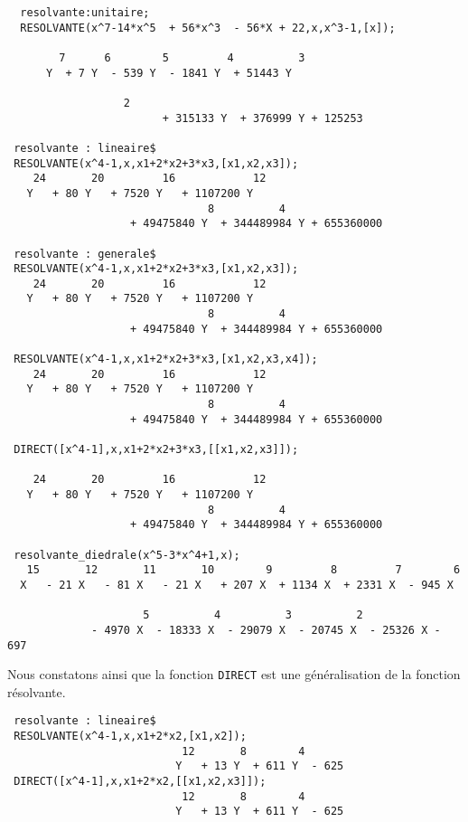 \begin{verbatim}
  resolvante:unitaire;
  RESOLVANTE(x^7-14*x^5  + 56*x^3  - 56*X + 22,x,x^3-1,[x]);

        7      6        5         4          3   
      Y  + 7 Y  - 539 Y  - 1841 Y  + 51443 Y  

				  2
                        + 315133 Y  + 376999 Y + 125253  

 resolvante : lineaire$
 RESOLVANTE(x^4-1,x,x1+2*x2+3*x3,[x1,x2,x3]);
    24       20         16            12       
   Y   + 80 Y   + 7520 Y   + 1107200 Y   
                               8	      4
                   + 49475840 Y  + 344489984 Y + 655360000
                                                      
 resolvante : generale$
 RESOLVANTE(x^4-1,x,x1+2*x2+3*x3,[x1,x2,x3]);
    24       20         16            12       
   Y   + 80 Y   + 7520 Y   + 1107200 Y   
                               8	      4
                   + 49475840 Y  + 344489984 Y + 655360000

 RESOLVANTE(x^4-1,x,x1+2*x2+3*x3,[x1,x2,x3,x4]);
    24       20         16            12       
   Y   + 80 Y   + 7520 Y   + 1107200 Y   
                               8	      4
                   + 49475840 Y  + 344489984 Y + 655360000

 DIRECT([x^4-1],x,x1+2*x2+3*x3,[[x1,x2,x3]]);

    24       20         16            12       
   Y   + 80 Y   + 7520 Y   + 1107200 Y   
                               8	      4
                   + 49475840 Y  + 344489984 Y + 655360000

 resolvante_diedrale(x^5-3*x^4+1,x);
   15       12       11       10        9         8         7        6
  X   - 21 X   - 81 X   - 21 X   + 207 X  + 1134 X  + 2331 X  - 945 X

                     5          4          3          2
             - 4970 X  - 18333 X  - 29079 X  - 20745 X  - 25326 X - 697
\end{verbatim}
\normalsize
Nous constatons ainsi que la fonction {\tt DIRECT} est une g\'en\'eralisation
de la fonction r\'esolvante.
\small
\begin{verbatim} 
 resolvante : lineaire$
 RESOLVANTE(x^4-1,x,x1+2*x2,[x1,x2]);
                           12       8        4
                          Y   + 13 Y  + 611 Y  - 625
 DIRECT([x^4-1],x,x1+2*x2,[[x1,x2,x3]]);
                           12       8        4
                          Y   + 13 Y  + 611 Y  - 625
\end{verbatim}
